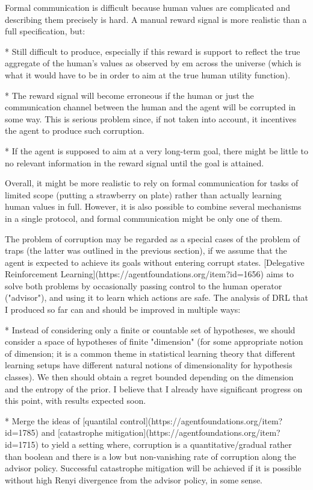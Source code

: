 \documentclass[a4paper]{article}
\begin{document}
Formal communication is difficult because human values are complicated and describing them precisely is hard. A manual reward signal is more realistic than a full specification, but:

* Still difficult to produce, especially if this reward is support to reflect the true aggregate of the human's values as observed by em across the universe (which is what it would have to be in order to aim at the true human utility function).

* The reward signal will become erroneous if the human or just the communication channel between the human and the agent will be corrupted in some way. This is serious problem since, if not taken into account, it incentives the agent to produce such corruption.

* If the agent is supposed to aim at a very long-term goal, there might be little to no relevant information in the reward signal until the goal is attained.

Overall, it might be more realistic to rely on formal communication for tasks of limited scope (putting a strawberry on plate) rather than actually learning human values in full. However, it is also possible to combine several mechanisms in a single protocol, and formal communication might be only one of them.

The problem of corruption may be regarded as a special cases of the problem of traps (the latter was outlined in the previous section), if we assume that the agent is expected to achieve its goals without entering corrupt states. [Delegative Reinforcement Learning](https://agentfoundations.org/item?id=1656) aims to solve both problems by occasionally passing control to the human operator ("advisor"), and using it to learn which actions are safe. The analysis of DRL that I produced so far can and should be improved in multiple ways:

* Instead of considering only a finite or countable set of hypotheses, we should consider a space of hypotheses of finite "dimension" (for some appropriate notion of dimension; it is a common theme in statistical learning theory that different learning setups have different natural notions of dimensionality for hypothesis classes). We then should obtain a regret bounded depending on the dimension and the entropy of the prior. I believe that I already have significant progress on this point, with results expected soon.

* Merge the ideas of [quantilal control](https://agentfoundations.org/item?id=1785) and [catastrophe mitigation](https://agentfoundations.org/item?id=1715) to yield a setting where, corruption is a quantitative/gradual rather than boolean and there is a low but non-vanishing rate of corruption along the advisor policy. Successful catastrophe mitigation will be achieved if it is possible without high Renyi divergence from the advisor policy, in some sense.
\end{document}
